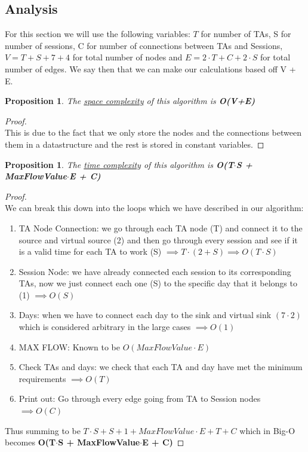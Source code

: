 \documentclass[12pt]{article}
\newtheorem{proposition}[theorem]{Proposition}
\begin{document}
\subsection{Analysis}
For this section we will use the following variables: $T$ for number of TAs, S for number of
sessions, C for number of connections between TAs and Sessions, $V = T + S + 7 + 4$ for total
number of nodes and $E = 2\cdot T + C + 2\cdot S$ for total number of edges. We say then that
we can make our calculations based off V + E.

\begin{proposition}
\label{numq}
The \underline{space complexity} of this algorithm is \textbf{O(V+E)}
\end{proposition}

\begin{proof}
~ \\ \indent This is due to the fact that we only store the nodes and the connections between
them in a datastructure and the rest is stored in constant variables.
\end{proof}

\begin{proposition}
\label{numq}
The \underline{time complexity} of this algorithm is \textbf{O(T$\cdot$S + MaxFlowValue$\cdot$E + C)}
\end{proposition}

\begin{proof}
~ \\ \indent We can break this down into the loops which we have described in our algorithm:
\begin{enumerate}
    \item TA Node Connection: we go through each TA node (T) and connect it to the source and
        virtual source (2) and then go through every session and see if it is a valid time
        for each TA to work (S) $\implies T\cdot (2+S) \implies O(T\cdot S)$
    \item Session Node: we have already connected each session to its corresponding TAs, now
        we just connect each one (S) to the specific day that it belongs to (1) $\implies O(S)$
    \item Days: when we have to connect each day to the sink and virtual sink $(7\cdot 2)$ which
        is considered arbitrary in the large cases $\implies O(1)$
    \item MAX FLOW: Known to be $O(MaxFlowValue\cdot E)$
    \item Check TAs and days: we check that each TA and day have met the minimum requirements
        $\implies O(T)$
    \item Print out: Go through every edge going from TA to Session nodes $\implies O(C)$
\end{enumerate}
Thus summing to be $T\cdot S + S + 1 + MaxFlowValue\cdot E + T + C$ which in Big-O becomes
\textbf{O(T$\cdot$S + MaxFlowValue$\cdot$E + C)}
\end{proof}




\end{document}
